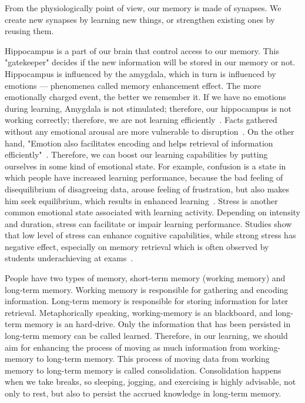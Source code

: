 \documentclass{article}
\begin{document}
From the physiologically point of view, our memory is made of synapses. We create new synapses by learning new things, or strengthen existing ones by reusing them.

Hippocampus is a part of our brain that control access to our memory. This "gatekeeper" decides if the new information will be stored in our memory or not. Hippocampus is influenced by the amygdala, which in turn is influenced by emotions — phenomenea called memory enhancement effect. The more emotionally charged event, the better we remember it. If we have no emotions during learning, Amygdala is not stimulated; therefore, our hippocampus is not working correctly; therefore, we are not learning efficiently~\cite{phelps2004human, tyng2017influences}. Facts gathered without any emotional arousal are more vulnerable to disruption~\cite{doi:10.1111/1467-9280.00090}. On the other hand, "Emotion also facilitates encoding and helps retrieval of information efficiently"~\cite{tyng2017influences}. Therefore, we can boost our learning capabilities by putting ourselves in some kind of emotional state. For example, confusion is a state in which people have increased learning performance, because the bad feeling of disequilibrium of disagreeing data, arouse feeling of frustration, but also makes him seek equilibrium, which results in enhanced learning~\cite{d2014confusion}. Stress is another common emotional state associated with learning activity. Depending on intensity and duration, stress can facilitate or impair learning performance. Studies show that low level of stress can enhance cognitive capabilities, while strong stress has negative effect, especially on memory retrieval which is often observed by students underachieving at exams~\cite{vogel2016learning}.

People have two types of memory, short-term memory (working memory) and long-term memory. Working memory is responsible for gathering and encoding information. Long-term memory is responsible for storing information for later retrieval. Metaphorically speaking, working-memory is an blackboard, and long-term memory is an hard-drive. Only the information that has been persisted in long-term memory can be called learned. Therefore, in our learning, we should aim for enhancing the process of moving as much information from working-memory to long-term memory. This process of moving data from working memory to long-term memory is called consolidation. Consolidation happens when we take breaks, so sleeping, jogging, and exercising is highly advisable, not only to rest, but also to persist the accrued knowledge in long-term memory.
\end{document}

